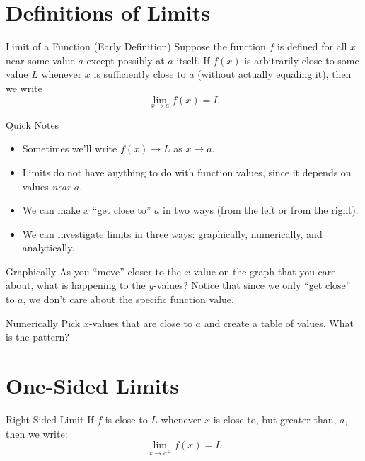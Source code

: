 \section{Definitions of Limits}

\begin{defn}{Limit of a Function (Early Definition)}
Suppose the function $f$ is defined for all $x$ near some value $a$ except possibly at $a$ itself. If $f(x)$ is arbitrarily close to some value $L$ whenever $x$ is sufficiently close to $a$ (without actually equaling it), then we write
\[\lim_{x\to a} f(x) = L\]
\end{defn}

\begin{note}{Quick Notes}
\hspace{1cm}
\begin{itemize}
\item Sometimes we'll write $f(x) \to L$ as $x\to a$.
\item Limits do not have anything to do with function values, since it depends on values \textit{near} $a$.
\item We can make $x$ ``get close to'' $a$ in two ways (from the left or from the right).
\item We can investigate limits in three ways: graphically, numerically, and analytically.
\end{itemize}
\end{note}

\begin{defn}{Graphically}
As you ``move'' closer to the $x$-value on the graph that you care about, what is happening to the $y$-values? Notice that since we only ``get close'' to $a$, we don't care about the specific function value.
\end{defn}

\begin{defn}{Numerically}
Pick $x$-values that are close to $a$ and create a table of values. What is the pattern?
\end{defn}

\section*{One-Sided Limits}

\begin{defn}{Right-Sided Limit}
If $f$ is close to $L$ whenever $x$ is close to, but greater than, $a$, then we write:
\[ \lim_{x\to a^+} f(x)=L\]
\end{defn}

